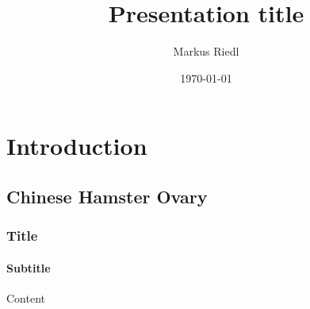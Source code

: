 \documentclass[aspectratio=169]{beamer}
\title{Presentation title}
\author{Markus Riedl}
\date{\today} %
\begin{document}
\begin{frame}
\titlepage
\end{frame}

\section{Introduction}

\subsection{Chinese Hamster Ovary}

\begin{frame}
    \frametitle{Title}
    \framesubtitle{Subtitle}

    Content
\end{frame}
\end{document}
